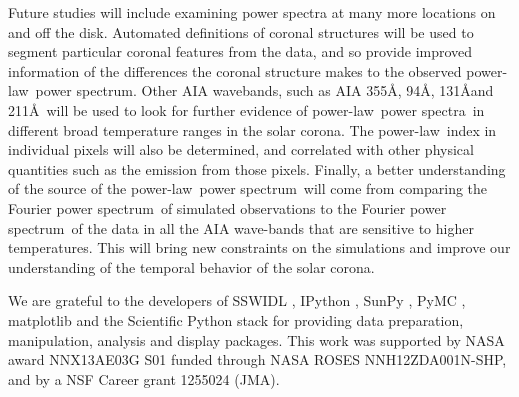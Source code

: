 \documentclass[onecolumn]{emulateapj}
\newcommand{\PS}{power spectrum}
\newcommand{\PA}{power spectra}
\newcommand{\PL}{power-law}
\newcommand{\Fps}{Fourier \PS}
\newcommand{\BF}{ }
\begin{document}
Future studies will include examining power spectra at many more
locations on and off the disk. {\BF Automated definitions of coronal
  structures will be used to segment particular coronal features from
  the data, and so provide improved information of the differences the
  coronal structure makes to the observed \PL\ \PS.  Other AIA
  wavebands, such as AIA 355\AA, 94\AA, 131\AA and 211\AA\ will be
  used to look for further evidence of \PL\ \PA\ in different broad
  temperature ranges in the solar corona.}  The \PL\ index in
individual pixels will also be determined, and correlated with other
physical quantities such as the emission from those pixels.  Finally,
a better understanding of the source of the \PL\ \PS\
will come from comparing the \Fps\ of simulated observations to the
\Fps\ of the data in all the AIA wave-bands that are sensitive to
higher temperatures.  This will bring new constraints on the
simulations and improve our understanding of the temporal behavior of
the solar corona.




\acknowledgments

We are grateful to the developers of SSWIDL
\citep{1998SoPh..182..497F}, IPython \citep{ipython}, SunPy
\citep{mumford-proc-scipy-2013}, PyMC
\citep{Patil:Huard:Fonnesbeck:2010:JSSOBK:v35i04}, matplotlib
\citep{Hunter:2007} and the Scientific Python stack for providing data
preparation, manipulation, analysis and display packages.  This work
was supported by NASA award NNX13AE03G S01 funded through NASA ROSES
NNH12ZDA001N-SHP, and by a NSF Career grant 1255024 (JMA).


\end{document}
